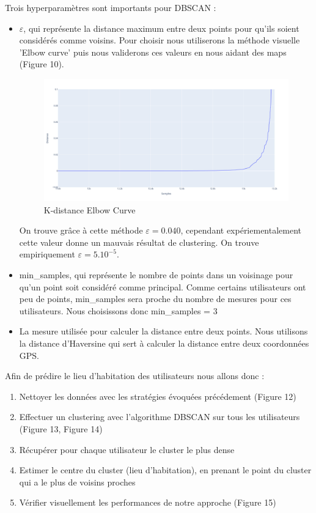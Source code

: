 \documentclass[10pt,a4paper]{article}
\begin{document}
\vspace{5mm}

Trois hyperparamètres sont importants pour DBSCAN :
\begin{itemize}[label=\textbullet, font=\LARGE]
    \item ${\varepsilon}$, qui représente la distance maximum entre deux points pour qu'ils soient considérés comme voisins.
          Pour choisir nous utiliserons la méthode visuelle 'Elbow curve' puis nous validerons ces valeurs en nous aidant des maps (Figure 10).
          \begin{figure}[H]
              \includegraphics[scale=0.25]{elbow}
              \centering
              \caption{K-distance Elbow Curve}
              \label{fig:figure11}
          \end{figure}
          On trouve grâce à cette méthode ${\varepsilon = 0.040}$, cependant expériementalement cette valeur donne un mauvais résultat de clustering. On trouve empiriquement ${\varepsilon = 5.10^{-5}}$.
    \item min\_samples, qui représente le nombre de points dans un voisinage pour qu'un point soit considéré comme principal.
          Comme certains utilisateurs ont peu de points, min\_samples sera proche du nombre de mesures pour ces utilisateurs. Nous choisissons donc min\_samples = 3
    \item La mesure utilisée pour calculer la distance entre deux points. Nous utilisons la distance d'Haversine qui sert à calculer la distance entre deux coordonnées GPS.
\end{itemize}


\vspace{5mm}
Afin de prédire le lieu d'habitation des utilisateurs nous allons donc :
\begin{enumerate}[(1)]
    \item Nettoyer les données avec les stratégies évoquées précédement (Figure 12)
    \item Effectuer un clustering avec l'algorithme DBSCAN sur tous les utilisateurs (Figure 13, Figure 14)
    \item Récupérer pour chaque utilisateur le cluster le plus dense
    \item Estimer le centre du cluster (lieu d'habitation), en prenant le point du cluster qui a le plus de voisins proches
    \item Vérifier visuellement les performances de notre approche (Figure 15)
\end{enumerate}
\end{document}
